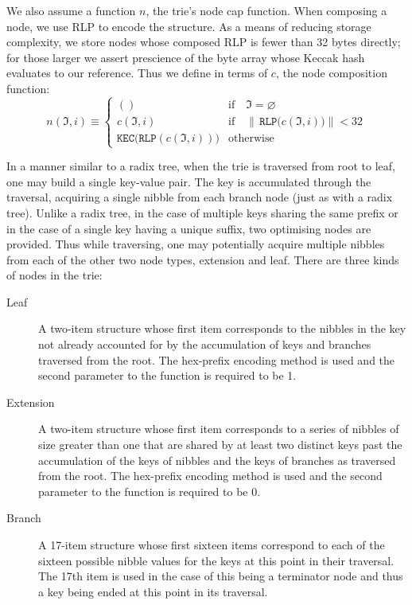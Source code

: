 \documentclass[9pt,oneside]{amsart}
\begin{document}
We also assume a function $n$, the trie's node cap function. When composing a node, we use RLP to encode the structure. As a means of reducing storage complexity, we store nodes whose composed RLP is fewer than 32 bytes directly; for those larger we assert prescience of the byte array whose Keccak hash evaluates to our reference. Thus we define in terms of $c$, the node composition function:
\begin{equation}
n(\mathfrak{I}, i) \equiv \begin{cases}
() & \text{if} \quad \mathfrak{I} = \varnothing \\
c(\mathfrak{I}, i) & \text{if} \quad \lVert \, \texttt{RLP} \big( c(\mathfrak{I}, i) \big) \rVert < 32 \\
\texttt{KEC}\big(\texttt{RLP}( c(\mathfrak{I}, i)) \big) & \text{otherwise}
\end{cases}
\end{equation}

In a manner similar to a radix tree, when the trie is traversed from root to leaf, one may build a single key-value pair. The key is accumulated through the traversal, acquiring a single nibble from each branch node (just as with a radix tree). Unlike a radix tree, in the case of multiple keys sharing the same prefix or in the case of a single key having a unique suffix, two optimising nodes are provided. Thus while traversing, one may potentially acquire multiple nibbles from each of the other two node types, extension and leaf. There are three kinds of nodes in the trie:
\begin{description}
\item[Leaf] A two-item structure whose first item corresponds to the nibbles in the key not already accounted for by the accumulation of keys and branches traversed from the root. The hex-prefix encoding method is used and the second parameter to the function is required to be 1.
\item[Extension] A two-item structure whose first item corresponds to a series of nibbles of size greater than one that are shared by at least two distinct keys past the accumulation of the keys of nibbles and the keys of branches as traversed from the root. The hex-prefix encoding method is used and the second parameter to the function is required to be 0.
\item[Branch] A 17-item structure whose first sixteen items correspond to each of the sixteen possible nibble values for the keys at this point in their traversal. The 17th item is used in the case of this being a terminator node and thus a key being ended at this point in its traversal.
\end{description}
\end{document}
